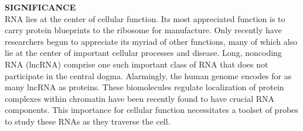 

\textbf{SIGNIFICANCE}\\
RNA lies at the center of cellular function. Its most appreciated function is to carry protein blueprints to the ribosome for manufacture. Only recently have researchers begun to appreciate its myriad of other functions, many of which also lie at the center of important cellular processes and disease.\cite{CechNoncodingRNARevolution2014,DellaRagioneNoncodingRNAschromatin2014}
Long, noncoding RNA (lncRNA) comprise one such important class of RNA that does not participate in the central dogma.\cite{RinnGenomeRegulationLong2012} Alarmingly, the human genome encodes for as many lncRNA as proteins.\cite{Rinntranscriptionalactivityhuman2003} These biomolecules regulate localization of protein complexes within chromatin
 have been recently found to have crucial RNA components.
This importance for cellular function necessitates a toolset of probes to study these RNAs as they traverse the cell.

